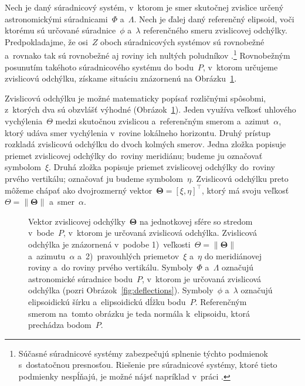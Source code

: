 \documentclass[a4paper, 12pt]{book}
\begin{document}
Nech je daný súradnicový systém, v~ktorom je smer skutočnej zvislice určený 
astronomickými súradnicami~$\Phi$ a~$\Lambda$.  Nech je ďalej daný referenčný 
elipsoid, voči ktorému sú určované súradnice~$\phi$ a~$\lambda$ referenčného 
smeru zvislicovej odchýlky.  Predpokladajme, že osi~$Z$ oboch súradnicových 
systémov sú rovnobežné a~rovnako tak sú rovnobežné aj roviny ich nultých 
poludníkov \parencite{TorgeGeodesy}.\footnote{Súčasné súradnicové systémy 
zabezpečujú splnenie týchto podmienok s~dostatočnou presnosťou.  Riešenie pre 
súradnicové systémy, ktoré tieto podmienky nespĺňajú, je možné nájsť napríklad 
v~práci \textcite{Pick2000}.}  Rovnobežným posunutím takéhoto súradnicového 
systému do bodu~$P$, v~ktorom určujeme zvislicovú odchýlku, získame situáciu 
znázornenú na Obrázku~\ref{fig:deflections_unit_sphere}.

Zvislicovú odchýlku je možné matematicky popísať rozličnými spôsobmi, z~ktorých 
dva sú obzvlášť výhodné (Obrázok~\ref{fig:deflections_unit_sphere}).  Jeden 
využíva veľkosť uhlového vychýlenia~$\Theta$ medzi skutočnou zvislicou 
a~referenčným smerom a~azimut~$\alpha$, ktorý udáva smer vychýlenia v~rovine 
lokálneho horizontu.  Druhý prístup rozkladá zvislicovú odchýlku do dvoch 
kolmých smerov.  Jedna zložka popisuje priemet zvislicovej odchýlky do~roviny 
meridiánu; budeme ju označovať symbolom~$\xi$.  Druhá zložka popisuje priemet 
zvislicovej odchýlky do~roviny prvého vertikálu; označovať ju budeme 
symbolom~$\eta$.  Zvislicovú odchýlku preto môžeme chápať ako dvojrozmerný 
vektor~$\boldsymbol\Theta = [\xi, \eta]^\top$, ktorý má svoju veľkosť~$\Theta 
= \| \boldsymbol\Theta \|$ a~smer~$\alpha$.

\begin{figure}[bt]
\centering

\caption{Vektor zvislicovej odchýlky~$\boldsymbol\Theta$ na jednotkovej sfére 
so stredom v~bode~$P$, v~ktorom je určovaná zvislicová odchýlka.  Zvislicová 
odchýlka je znázornená v~podobe 1)~veľkosti~$\Theta = \| \boldsymbol\Theta \|$ 
a~azimutu~$\alpha$ a~2)~pravouhlých priemetov~$\xi$ a~$\eta$ do meridiánovej 
roviny a~do roviny prvého vertikálu.  Symboly~$\Phi$ a~$\Lambda$ označujú 
astronomické súradnice bodu~$P$, v~ktorom je určovaná zvislicová odchýlka 
(pozri Obrázok~\ref{fig:deflections}).  Symboly~$\phi$ a~$\lambda$ označujú 
elipsoidickú šírku a~elipsoidickú dĺžku bodu~$P$.  Referenčným smerom na~tomto 
obrázku je teda normála k~elipsoidu, ktorá prechádza bodom~$P$.}
\label{fig:deflections_unit_sphere}
\end{figure}
\end{document}
